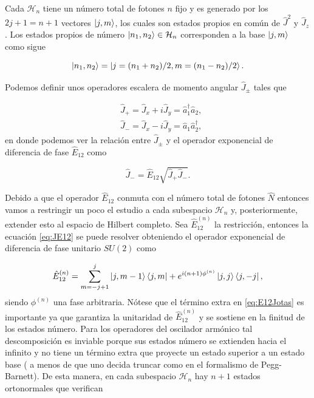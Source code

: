     Cada $\mathcal{H}_n$ tiene un número total de fotones $n$ fijo y es generado por los $2j+1=n+1$ vectores $\ket{j,m}$, los cuales son estados propios en común de $\hat{J}^2$ y $\hat{J}_z$. Los estados propios de número $\ket{n_1,n_2}\in \mathcal{H}_n$ corresponden a la base $\ket{j,m}$ como sigue

    \begin{equation}
        \ket{n_1,n_2} = \ket{j = (n_1+n_2)/2, m = (n_1-n_2)/2}.
    \end{equation}

    Podemos definir unos operadores escalera de momento angular $\hat{J}_\pm$ tales que

    \begin{align}
        & \hat{J}_+ = \hat{J}_x + i \hat{J}_y = \hat{a}_1^\dagger\hat{a}_2,\\
        & \hat{J}_- = \hat{J}_x -i\hat{J}_y = \hat{a}_1\hat{a}_2^\dagger,
    \end{align}
    en donde podemos ver la relación entre $\hat{J}_\pm$ y el operador exponencial de diferencia de fase $\hat{E}_{12}$ como

    \begin{equation}\label{eq:JE12}
        \hat{J}_- = \hat{E}_{12}\sqrt{\hat{J}_+\hat{J}_-}.
    \end{equation}

    Debido a que el operador $\hat{E}_{12}$ conmuta con el número total de fotones $\hat{N}$ entonces vamos a restringir un poco el estudio a cada subespacio $\mathcal{H}_n$ y, posteriormente, extender esto al espacio de Hilbert completo. Sea $\hat{E}_{12}^{(n)}$ la restricción, entonces la ecuación \ref{eq:JE12} se puede resolver obteniendo el operador exponencial de diferencia de fase unitario $SU(2)$ como

    \begin{equation}\label{eq:E12Jotas}
        \hat{E}_{12}^{(n)} = \sum_{m=-j+1}^j \ket{j,m-1}\bra{j,m}+e^{i(n+1)\phi^{(n)}}\ket{j,j}\bra{j,-j},
    \end{equation}
    siendo $\phi^{(n)}$ una fase arbitraria. Nótese que el término extra en \ref{eq:E12Jotas} es importante ya que garantiza la unitaridad de $\hat{E}_{12}^{(n)}$ y se sostiene en la finitud de los estados número. Para los operadores del oscilador armónico tal descomposición es inviable porque sus estados número se extienden hacia el infinito y no tiene un término extra que proyecte un estado superior a un estado base ( a menos de que uno decida truncar como en el formalismo de Pegg-Barnett). De esta manera, en cada subespacio $\mathcal{H}_n$ hay $n+1$ estados ortonormales que verifican

